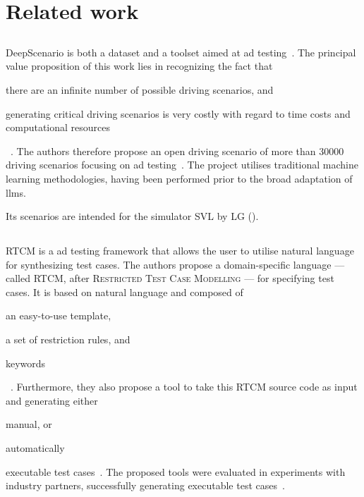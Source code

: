 \section{Related work}\label{sec:relatedWork}

\subsection{}\label{sec:deepScenario}

DeepScenario is both a dataset and a toolset aimed at \acrlong{ad} testing~\cite{DeepScenario}. The
principal value proposition of this work lies in recognizing the fact that \begin{inparaenum}
    \item there are an infinite number of possible driving scenarios, and
    \item generating critical driving scenarios is very costly with regard to time costs and
    computational resources\end{inparaenum}~\cite[52]{DeepScenario}. The authors therefore propose
an open driving scenario of more than \num{30000} driving scenarios focusing on \acrshort{ad}
testing~\cite[52]{DeepScenario}. The project utilises traditional machine learning
methodologies, having been performed prior to the broad adaptation of \acrshort{llms}.

Its scenarios are intended for the simulator SVL by LG ().

\subsection{}

RTCM is a \acrshort{ad} testing framework that allows the user to utilise natural language for
synthesizing test cases. The authors propose a domain-specific language --- called RTCM, after
\textsc{Restricted Test Case Modelling} --- for specifying test cases. It is based on natural language
and composed of \begin{inparaenum}
    \item an easy-to-use template,
    \item a set of restriction rules, and
    \item keywords \end{inparaenum}~\cite[397]{RTCM}.  Furthermore, they also propose a tool to
take this RTCM source code as input and generating either \begin{inparaenum}
    \item manual, or
    \item automatically \end{inparaenum} executable test cases~\cite[397]{RTCM}. The proposed tools
were evaluated in experiments with industry partners, successfully generating executable test
cases~\cite[397]{RTCM}.

